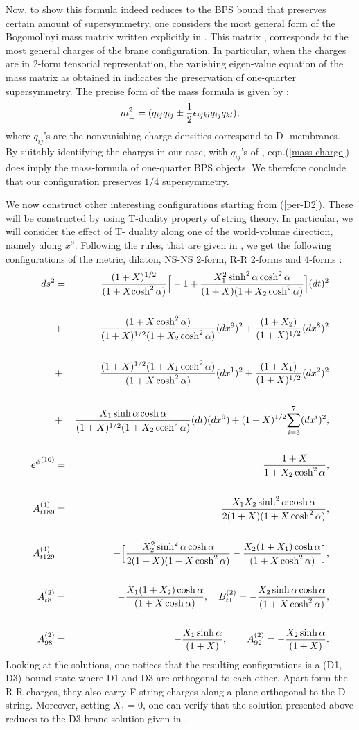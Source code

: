 \documentclass[a4paper,12pt,fleqn,cite,epsfig]{article}
\begin{document}
Now, to show this formula indeed reduces to the BPS bound
that preserves certain amount of supersymmetry, one considers 
the most general form of the Bogomol'nyi mass matrix written 
explicitly in \cite{pope}. This matrix \cite{pope}, corresponds
to the most general charges of the brane configuration. In particular,
when the charges are in 2-form tensorial representation, 
the vanishing eigen-value equation of the mass matrix as obtained in 
\cite{myers1} indicates the preservation of one-quarter supersymmetry. 
The precise form of the mass formula \cite{myers1} is given by : 
\begin{equation}
m_{\pm}^2 = (q_{i j} q_{i j} \pm {1\over 2}\epsilon_{i j k l}q_{i
  j}q_{k l}), 
\end{equation}
where $q_{i j}$'s are the nonvanishing charge densities
correspond to D- membranes.
By suitably identifying the charges in our case, with $q_{i j}$'s 
of \cite{myers1}, eqn.(\ref{mass-charge}) does imply the mass-formula
of one-quarter BPS objects. We therefore conclude that our
configuration preserves $1/4$ supersymmetry.

We now construct other interesting configurations starting from
(\ref{per-D2}). These will be constructed by using
T-duality property of string theory. In particular, we will 
consider the effect of T- duality along one of the world-volume
direction, namely along $x^9$. Following the rules, that are given in 
\cite{ortin,myers}, we get the following configurations of the
metric, dilaton, NS-NS 2-form, R-R 2-forms and 4-forms : 
\begin {eqnarray}
ds^2 &=&
{{(1+X)^{1/2}}\over(1+X{\cosh^2\alpha})}\Big[-1+{{X_1^{2}\sinh^2\alpha\cosh^2
\alpha}\over{(1+X)(1+X_2\cosh^2\alpha)}}\Big]{(dt)^2}\cr
& \cr
&+& {(1+X\cosh^2\alpha)\over{(1+X)^{1/2}(1+X_2\cosh^2\alpha)}}(dx^9)^2
+ {(1+X_2)\over(1+X)^{1/2}}{(dx^8)^2} \cr
& \cr
&+&{(1+X)^{1/2}(1+X_1\cosh^2\alpha)
\over(1+X\cosh^2\alpha)}{(dx^1)^2}+{(1+X_1)\over(1+X)^{1/2}}{(dx^2)^2}\cr
& \cr
&+&{X_1\sinh\alpha\cosh\alpha\over{(1+X)^{1/2}(1+X_2\cosh^2\alpha)}}(dt)(dx^9)
+(1+X)^{1/2}{\sum_{i=3}^7}(dx^i)^2,\cr
& \cr
{e^{\phi}}^{(10)} &=& {{1 + X} \over{1 + X_2\cosh^2\alpha}}, \cr
& \cr
A^{(4)}_{t 1 8 9} &=&
{X_1 X_2\sinh^2\alpha\cosh\alpha\over2(1+X)(1+X\cosh^2\alpha)},\cr
& \cr
A^{(4)}_{t 1 2 9}&=&
-\Big[{{X_2^{2}\sinh^2\alpha\cosh\alpha\over{2(1+X)(1+X\cosh^2\alpha)}}
- {X_2(1+X_1)\cosh\alpha\over{(1+X\cosh^2\alpha)}}}\Big],\cr
& \cr
A^{(2)}_{t 8} &=& - {{X_1(1+X_2)\cosh\alpha}\over(1+X\cosh\alpha)} , ~~~
B^{(2)}_{t 1} =-{X_2\sinh\alpha\cosh\alpha\over{(1+X\cosh^2\alpha)}},\cr
& \cr
A^{(2)}_{9 8}&=& - {X_1\sinh\alpha\over(1+X)},~~~~~~ A^{(2)}_{9 2}
=-{X_2\sinh\alpha\over(1+X)}. 
\end{eqnarray}
Looking at the solutions, one notices that the resulting
configurations is a (D1, D3)-bound state where D1 and D3 are
orthogonal to each other. Apart form the R-R charges, they also
carry F-string charges along a plane orthogonal to the D-string.
Moreover, setting $X_1 = 0$, one can verify that the solution
presented above reduces to the D3-brane solution given in
\cite{kamal}.  
  
\end{document}
